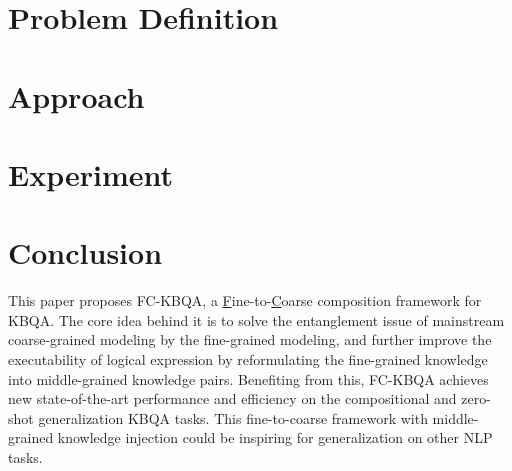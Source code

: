 \documentclass[11pt]{article}
\newcommand{\model}{FC-KBQA}
\newcommand{\smodel}{FC-KBQA }
\begin{document}
\section{Problem Definition}
\label{sec:problem}


\section{Approach}


\section{Experiment}


\section{Conclusion}
This paper proposes \model, a \underline{F}ine-to-\underline{C}oarse composition framework for KBQA. The core idea behind it is to solve the 
entanglement issue of mainstream coarse-grained modeling by the fine-grained modeling, and further improve the executability of logical expression by reformulating the fine-grained knowledge into middle-grained knowledge pairs.
Benefiting from this, \smodel achieves new state-of-the-art performance and efficiency on the compositional and zero-shot generalization KBQA tasks. 
This fine-to-coarse framework with middle-grained knowledge injection could be inspiring for generalization on other NLP tasks.
\end{document}
